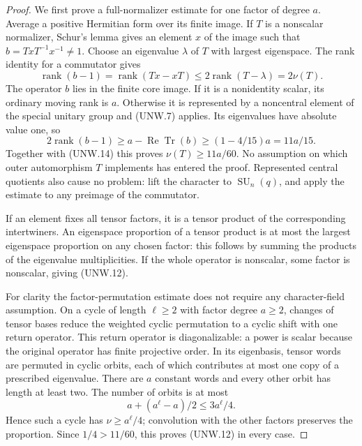 \begin{proof}
We first prove a full-normalizer estimate for one factor of degree
$a$.  Average a positive Hermitian form over its finite image.
If $T$ is a nonscalar normalizer, Schur's lemma gives an element
$x$ of the image such that $b=TxT^{-1}x^{-1}\ne1$.
Choose an eigenvalue $\lambda$ of $T$ with largest eigenspace.
The rank identity for a commutator gives
\[
 \operatorname{rank}(b-1)
 =\operatorname{rank}(Tx-xT)
 \le2\operatorname{rank}(T-\lambda)=2\nu(T).                \tag{UNW.14}
\]
The operator $b$ lies in the finite core image.  If it is a
nonidentity scalar, its ordinary moving rank is $a$.
Otherwise it is represented by a noncentral element of the
special unitary group and (UNW.7) applies.  Its eigenvalues have
absolute value one, so
\[
 2\operatorname{rank}(b-1)
 \ge a-\operatorname{Re}\operatorname{Tr}(b)
 \ge(1-4/15)a=11a/15.
\]
Together with (UNW.14) this proves $\nu(T)\ge11a/60$.
No assumption on which outer automorphism $T$ implements has
entered the proof.  Represented central quotients also cause no
problem: lift the character to $\operatorname{SU}_n(q)$, and
apply the estimate to any preimage of the commutator.

If an element fixes all tensor factors, it is a tensor product
of the corresponding intertwiners.  An eigenspace proportion of
a tensor product is at most the largest eigenspace proportion
on any chosen factor: this follows by summing the products of
the eigenvalue multiplicities.  If the whole operator is
nonscalar, some factor is nonscalar, giving (UNW.12).

For clarity the factor-permutation estimate does not require
any character-field assumption.  On a cycle of length
$\ell\ge2$ with factor degree $a\ge2$, changes of tensor bases
reduce the weighted cyclic permutation to a cyclic shift with
one return operator.  This return operator is diagonalizable:
a power is scalar because the original operator has finite
projective order.  In its eigenbasis, tensor words are permuted
in cyclic orbits, each of which contributes at most one copy
of a prescribed eigenvalue.  There are $a$ constant words and
every other orbit has length at least two.  The number of orbits
is at most
\[
 a+(a^\ell-a)/2\le3a^\ell/4.
\]
Hence such a cycle has $\nu\ge a^\ell/4$; convolution with the
other factors preserves the proportion.  Since $1/4>11/60$,
this proves (UNW.12) in every case.


\end{proof}
